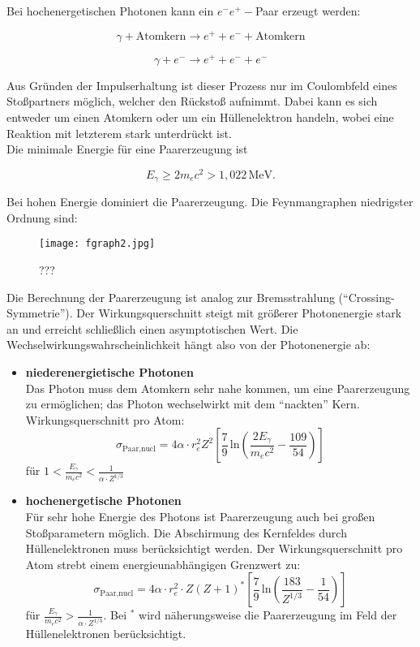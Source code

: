 Bei hochenergetischen Photonen kann ein $e^-e^+-$Paar erzeugt werden:

\[\gamma + \text{Atomkern} \longrightarrow e^+ + e^- +  \text{Atomkern} \]

\[\gamma + e^- \longrightarrow e^+ + e^- +  e^- \]

Aus Gründen der Impulserhaltung ist dieser Prozess nur im Coulombfeld eines Stoßpartners möglich,
welcher den Rückstoß aufnimmt. Dabei kann es sich entweder um einen Atomkern oder um ein
Hüllenelektron handeln, wobei eine Reaktion mit letzterem stark unterdrückt ist. 
\\
Die minimale Energie für eine Paarerzeugung ist

\[ E_\gamma \geq 2m_ec^2 > 1{,}022\,\text{MeV}. \]

Bei hohen Energie dominiert die Paarerzeugung. Die Feynmangraphen niedrigster Ordnung sind:

\begin{figure}[H]
	\centering
	\texttt{[image: fgraph2.jpg]}
	\caption{	 ???}
	\label{fgraph2}
\end{figure}

Die Berechnung der Paarerzeugung ist analog zur Bremsstrahlung ("`Crossing-Symmetrie"'). Der
Wirkungsquerschnitt steigt mit größerer Photonenergie stark an und erreicht schließlich einen
asymptotischen Wert. Die Wechselwirkungswahrscheinlichkeit hängt also von der Photonenergie ab:

\begin{itemize}
  \item \textbf{niederenergietische Photonen}\\
  Das Photon muss dem Atomkern sehr nahe kommen, um eine Paarerzeugung zu ermöglichen; das Photon
  wechselwirkt mit dem "`nackten"' Kern. Wirkungsquerschnitt pro Atom:
  \[\sigma_{\text{Paar,nucl}} = 4\alpha\cdot r_e^2 Z^2
  \left[\frac{7}{9}\,\text{ln}\left(\frac{2E_\gamma}{m_ec^2}-\frac{109}{54} \right) \right]  \]
  für $1< \frac{E_\gamma}{m_ec^2} < \frac{1}{\alpha\cdot Z^{1/3}}$
  \item \textbf{hochenergetische Photonen}\\
  Für sehr hohe Energie des Photons ist Paarerzeugung auch bei großen Stoßparametern möglich. Die
  Abschirmung des Kernfeldes durch Hüllen\-elektronen muss berücksichtigt werden. Der
  Wirkungsquerschnitt pro Atom strebt einem energieunabhängigen Grenzwert zu:
  \[\sigma_{\text{Paar,nucl}} = 4\alpha\cdot r_e^2\cdot Z(Z+1)^*
  \left[\frac{7}{9}\,\text{ln}\left(\frac{183}{Z^{1/3}}-\frac{1}{54} \right) \right]  \]
  für $\frac{E_\gamma}{m_ec^2} > \frac{1}{\alpha\cdot Z^{1/3}}$. Bei $^*$ wird näherungsweise die
  Paarerzeugung im Feld der Hüllenelektronen berücksichtigt.
\end{itemize}

